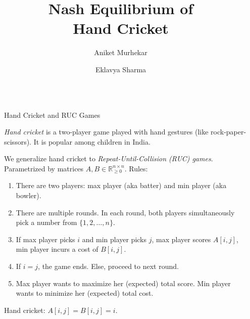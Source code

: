 \documentclass[final,20pt]{beamer}
\title{Nash Equilibrium of\texorpdfstring{\\}{ }Hand Cricket}
\author{Aniket Murhekar \inst{1} \and Eklavya Sharma \inst{2}}
\institute[shortinst]{\inst{1} aniket2@illinois.edu \samelineand \inst{2} eklavya2@illinois.edu}
\newlength{\sepwidth}
\newlength{\colwidth}
\newcommand{\separatorcolumn}{\begin{column}{\sepwidth}\end{column}}
\begin{document}
\begin{frame}[t]
\begin{columns}[t]
\separatorcolumn

\begin{column}{\colwidth}

\begin{block}{Hand Cricket and RUC Games}

\emph{Hand cricket} is a two-player game played with hand gestures (like rock-paper-scissors).
It is popular among children in India.

We generalize hand cricket to \emph{Repeat-Until-Collision (RUC) games}.
Parametrized by matrices $A, B \in \mathbb{R}_{\ge 0}^{n \times n}$.
Rules:
\begin{enumerate}
\item There are two players: max player (aka batter) and min player (aka bowler).
\item There are multiple rounds. In each round, both players simultaneously
    pick a number from $\{1, 2, \ldots, n\}$.
\item If max player picks $i$ and min player picks $j$,
    max player scores $A[i, j]$, min player incurs a cost of $B[i, j]$.
\item If $i = j$, the game ends. Else, proceed to next round.
\item Max player wants to maximize her (expected) total score.
    Min player wants to minimize her (expected) total cost.
\end{enumerate}

Hand cricket: $A[i, j] = B[i, j] = i$.


\end{block}
\end{column}
\end{columns}
\end{frame}
\end{document}
